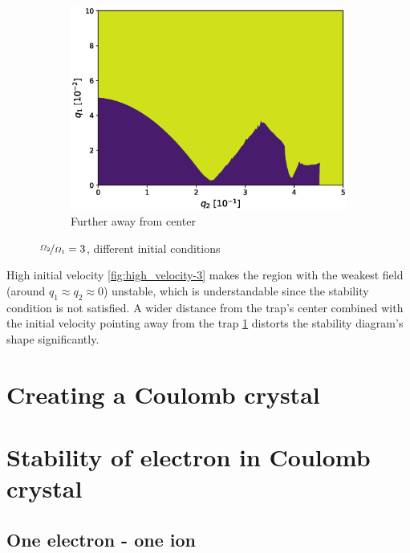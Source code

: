 \begin{figure}[H]
\begin{subfigure}{.3\textwidth}
  \includegraphics[width=\linewidth]{img/0_ions_1_electrons_q1_0.0-0.1_q2_0.0-0.5_960x960_3.eps}  
  \caption{Further away from center}
  \label{fig:large_radius-3}
\end{subfigure}
\caption{$\nicefrac{\Omega_2}{\Omega_1} = 3$, different initial conditions}
\label{fig:init-conds-eta=3}
\end{figure}

High initial velocity \ref{fig:high_velocity-3} makes the region with the weakest field (around $q_1 \approx q_2 \approx 0$) unstable, which is understandable since the stability condition  is not satisfied. A wider distance from the trap's center combined with the initial velocity pointing away from the trap \ref{fig:large_radius-3} distorts the stability diagram's shape significantly. 


\section{Creating a Coulomb crystal}

\section{Stability of electron in Coulomb crystal}
\subsection{One electron - one ion}
